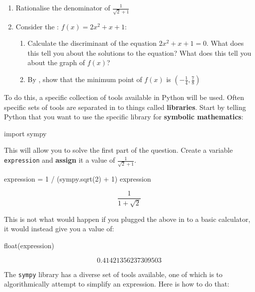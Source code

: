 \begin{enumerate}

\item 
Rationalise the denominator of \(\frac{1}{\sqrt{2} + 1}\)

\item 
Consider the : \(f(x)=2x ^ 2 + x + 1\):

\begin{enumerate}

\item Calculate the discriminant of the  equation \(2x ^ 2 + x + 1 =
0\). What does this tell you about the solutions to the equation? What
does this tell you about the graph of \(f(x)\)?

\item By , show that the minimum point of \(f(x)\) is
\(\left(-\frac{1}{4}, \frac{7}{8}\right)\)

\end{enumerate}

\end{enumerate}


To do this, a specific collection of tools available in Python will be used.
Often specific sets of tools are separated in to things called \textbf{libraries}. 
Start by telling Python that you want to use the specific library for \textbf{symbolic
mathematics}:

\begin{pyin}
import sympy
\end{pyin}

This will allow you to solve the first part of the question. Create a
variable \texttt{expression} and \textbf{assign} it a value of \(\frac{1}{\sqrt{2} + 1}\).

\begin{pyin}
expression = 1 / (sympy.sqrt(2) + 1)
expression
\end{pyin}

\[\frac{1}{1 + \sqrt{2}}\]

\begin{note}
This is not what would happen if you plugged the above in to a basic calculator,
it would instead give you a value of:
\end{note}


\begin{pyin}
float(expression)
\end{pyin}

\[0.41421356237309503\]

The \texttt{sympy} library has a diverse set of tools available, one of which is to
algorithmically attempt to simplify an expression. Here is how to do that:

